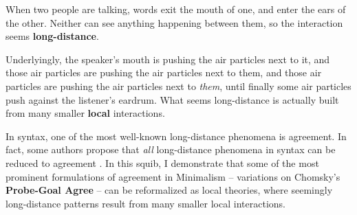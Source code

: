 
\label{ch:intro}

When two people are talking, words exit the mouth of one, and enter the ears of the other. Neither can see anything happening between them, so the interaction seems \textbf{long-distance}. 

Underlyingly, the speaker’s mouth is pushing the air particles next to it, and those air particles are pushing the air particles next to them, and those air particles are pushing the air particles next to \textit{them}, until finally some air particles push against the listener’s eardrum. What seems long-distance is actually built from many smaller \textbf{local} interactions.

In syntax, one of the most well-known long-distance phenomena is agreement. In fact, some authors propose that \textit{all} long-distance phenomena in syntax can be reduced to agreement \citep{deal2025}. In this squib, I demonstrate that some of the most prominent formulations of agreement in Minimalism – variations on Chomsky’s \citeyearpar{chomsky2001} \textbf{Probe-Goal Agree} – can be reformalized as local theories, where seemingly long-distance patterns result from many smaller local interactions.
